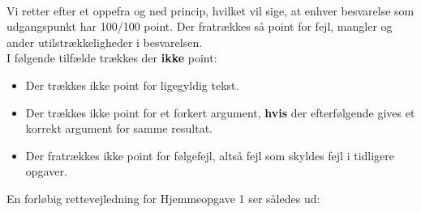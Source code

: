 \documentclass{article}
\begin{document}
\vspace*{0.2cm}\\
Vi retter efter et oppefra og ned princip, hvilket vil sige, at enhver besvarelse som udgangspunkt har 100/100 point. Der fratrækkes så point for fejl, mangler og ander utilstrækkeligheder i besvarelsen.
\vspace*{0.2cm}\\
I følgende tilfælde trækkes der \textbf{ikke} point:
\begin{itemize}
	\item Der trækkes ikke point for ligegyldig tekst.
	\item Der trækkes ikke point for et forkert argument, \textbf{hvis} der efterfølgende gives et korrekt argument for samme resultat.
	\item Der fratrækkes ikke point for følgefejl, altså fejl som skyldes fejl i tidligere opgaver.
\end{itemize}

En forløbig rettevejledning for Hjemmeopgave 1 ser således ud:
\end{document}

